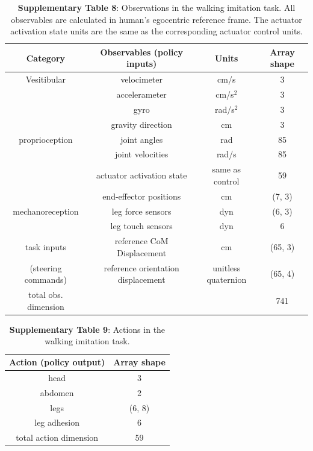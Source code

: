 \documentclass[sn-mathphys-num]{sn-jnl}%
\theoremstyle{thmstyleone}%
\theoremstyle{thmstyletwo}%
\theoremstyle{thmstylethree}%
\begin{document}
\begin{appendices}
\begin{table}[htbp]
	\centering
	\small
	\caption{\textbf{Supplementary Table 8}: 
		Observations in the walking imitation task. 
		All observables are calculated in human's egocentric reference frame.
		The actuator activation state units are the same as the corresponding actuator control units.}
	\begin{tabular}{cccc}
		\toprule
		Category         &        Observables (policy inputs)  & Units  & Array shape  \\
		\midrule
		Vesitibular     &  velocimeter      &   cm/s & 3  \\
		&  accelerameter      &   cm/s$ ^2 $ & 3  \\
		&  gyro      &   rad/s$ ^2 $ & 3  \\
		&  gravity direction      &   cm & 3  \\
		\midrule
		proprioception     &  joint angles      &   rad & 85  \\
		&  joint velocities      &   rad/s & 85  \\
		&  actuator activation state      &   same as control & 59  \\
		&  end-effector positions      &   cm & (7, 3)  \\
		\midrule
		mechanoreception     &  leg force sensors      &   dyn & (6, 3)  \\
		     &  leg touch sensors      &   dyn & 6  \\
		\midrule
		task inputs     &  reference CoM Displacement      &   cm & (65, 3)  \\
		(steering commands)     &  reference orientation displacement      &   \makecell{unitless \\quaternion} & (65, 4)  \\
		\midrule
		total obs. dimension     &        &    & 741  \\
		\bottomrule
	\end{tabular}%
	\label{tab:s_8}%
\end{table}%


\begin{table}[htbp]
	\centering
	\small
	\caption{\textbf{Supplementary Table 9}: 
		Actions in the walking imitation task.
	}
	\begin{tabular}{cc}
		\toprule
		\textbf{Action (policy output)}         &        \textbf{Array shape}    \\
		\midrule
		head     &  3        \\
		abdomen     &  2        \\
		legs     &  (6, 8)        \\
		leg adhesion     &  6        \\
		\midrule
		total action dimension     &  59        \\
		\bottomrule
	\end{tabular}%
	\label{tab:s_9}%
\end{table}%




\end{appendices}
\end{document}
